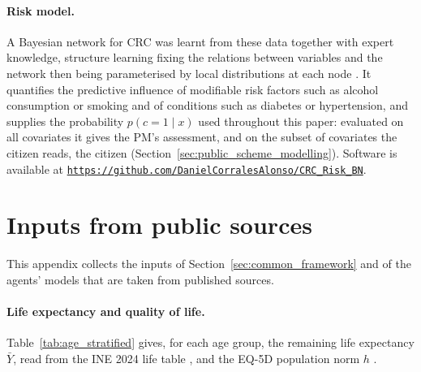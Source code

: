 \documentclass[12pt]{article}
\begin{document}
\paragraph{Risk model.} A Bayesian network for CRC was learnt from these data together with expert knowledge, structure learning fixing the relations between variables and the network then being parameterised by local distributions at each node \citep{corrales2024colorectal}. It quantifies the predictive influence of modifiable risk factors such as alcohol consumption or smoking and of conditions such as diabetes or hypertension, and supplies the probability $p(c = 1 \mid x)$ used throughout this paper: evaluated on all covariates it gives the PM's assessment, and on the subset of covariates the citizen reads, the citizen (Section~\ref{sec:public_scheme_modelling}). Software is available at \texttt{\url{https://github.com/DanielCorralesAlonso/CRC_Risk_BN}}.



\section{Inputs from public sources}\label{appendix:prob}

This appendix collects the inputs of Section~\ref{sec:common_framework} and of the agents' models that are taken from published sources.

\paragraph{Life expectancy and quality of life.} Table~\ref{tab:age_stratified} gives, for each age group, the remaining life expectancy $\bar Y$, read from the INE 2024 life table \citep{ine2024mortalidad}, and the EQ-5D population norm $h$ \citep{garcia2016normative}.
\end{document}
